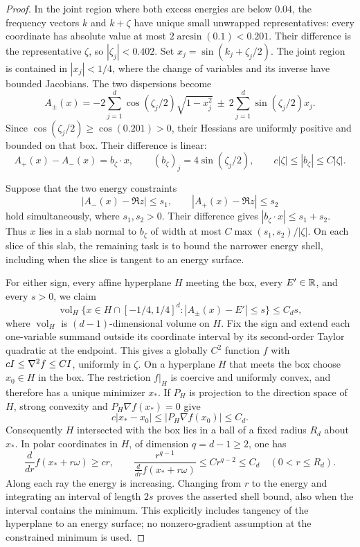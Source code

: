 \begin{proof}
In the joint region where both excess energies are below $0.04$,
the frequency vectors $k$ and $k+\zeta$ have unique small unwrapped
representatives: every coordinate has absolute value at most
$2\arcsin(0.1)<0.201$. Their difference is the representative
$\zeta$, so $|\zeta_j|<0.402$. Set
$x_j=\sin(k_j+\zeta_j/2)$. The joint region is contained in
$|x_j|<1/4$, where the change of variables and its inverse have bounded
Jacobians. The two dispersions become
\[
 A_\pm(x)=-2\sum_{j=1}^d\cos(\zeta_j/2)\sqrt{1-x_j^2}
             \ \pm\ 2\sum_{j=1}^d\sin(\zeta_j/2)x_j.
\]
Since $\cos(\zeta_j/2)\ge\cos(0.201)>0$, their Hessians are
uniformly positive and bounded on that box. Their
difference is linear:
\[
 A_+(x)-A_-(x)=b_\zeta\cdot x,
 \qquad (b_\zeta)_j=4\sin(\zeta_j/2),
 \qquad c|\zeta|\le|b_\zeta|\le C|\zeta|.
\]

Suppose that the two energy constraints
\[
 |A_-(x)-\Re z|\le s_1,\qquad |A_+(x)-\Re z|\le s_2
\]
hold simultaneously, where $s_1,s_2>0$. Their difference gives
$|b_\zeta\cdot x|\le s_1+s_2$. Thus $x$ lies in a slab normal to
$b_\zeta$ of width at most $C\max(s_1,s_2)/|\zeta|$. On each slice
of this slab, the remaining task is to bound the narrower energy shell,
including when the slice is tangent to an energy surface.

For either sign, every affine hyperplane $H$ meeting the box, every
$E'\in\mathbb R$, and every $s>0$, we claim
\[
 \operatorname{vol}_{H}\bigl\{x\in H\cap[-1/4,1/4]^d:
             |A_\pm(x)-E'|\le s\bigr\}\le C_ds,
\]
where $\operatorname{vol}_{H}$ is $(d-1)$-dimensional volume on $H$.
Fix the sign and extend each one-variable summand outside its
coordinate interval by its second-order Taylor quadratic at the
endpoint. This gives a globally $C^2$ function $f$ with
$cI\le\nabla^2f\le CI$, uniformly in $\zeta$. On a hyperplane
$H$ that meets the box choose $x_0\in H$ in the box. The restriction
$f|_H$ is coercive and uniformly convex, and therefore has a unique
minimizer $x_*$. If $P_H$ is projection to the direction space of $H$,
strong convexity and $P_H\nabla f(x_*)=0$ give
\[
 c|x_*-x_0|\le |P_H\nabla f(x_0)|\le C_d.
\]
Consequently $H$ intersected with the box lies in a ball of a fixed
radius $R_d$ about $x_*$. In polar coordinates in $H$, of dimension
$q=d-1\ge2$, one has
\[
 \frac{d}{dr}f(x_*+r\omega)\ge cr,
 \qquad
 \frac{r^{q-1}}{\frac{d}{dr}f(x_*+r\omega)}
       \le C r^{q-2}\le C_d\quad(0<r\le R_d).
\]
Along each ray the energy is increasing. Changing from $r$ to the
energy and integrating an interval of length $2s$ proves the asserted
shell bound, also when the interval contains the minimum. This
explicitly includes tangency of the hyperplane to an energy surface;
no nonzero-gradient assumption at the constrained minimum is used.


\end{proof}

